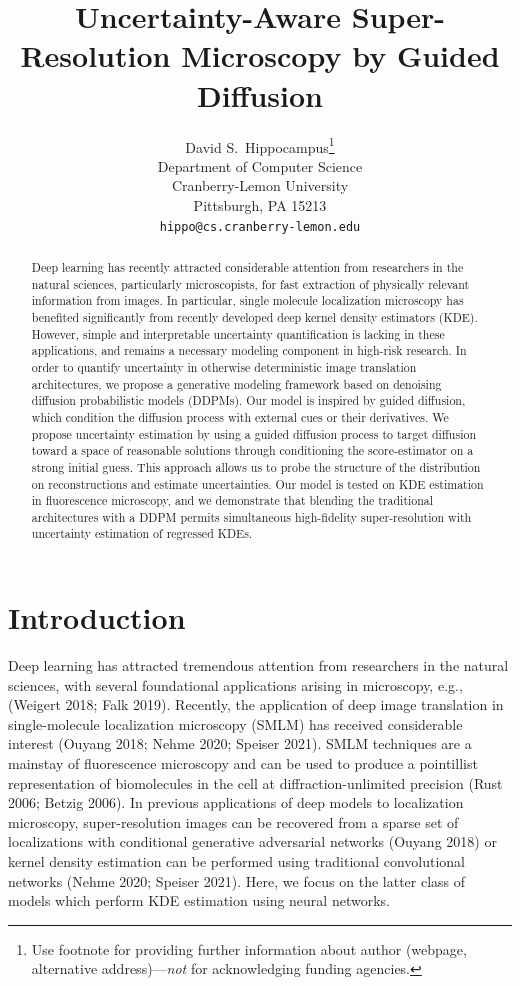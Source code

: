 \documentclass{article}
\title{Uncertainty-Aware Super-Resolution Microscopy by Guided Diffusion}
\author{%
  David S.~Hippocampus\thanks{Use footnote for providing further information
    about author (webpage, alternative address)---\emph{not} for acknowledging
    funding agencies.} \\
  Department of Computer Science\\
  Cranberry-Lemon University\\
  Pittsburgh, PA 15213 \\
  \texttt{hippo@cs.cranberry-lemon.edu} \\
}
\begin{document}
\maketitle


\begin{abstract}

Deep learning has recently attracted considerable attention from researchers in the natural sciences, particularly microscopists, for fast extraction of physically relevant information from images. In particular, single molecule localization microscopy has benefited significantly from recently developed deep kernel density estimators (KDE). However, simple and interpretable uncertainty quantification is lacking in these applications, and remains a necessary modeling component in high-risk research. In order to quantify uncertainty in otherwise deterministic image translation architectures, we propose a generative modeling framework based on denoising diffusion probabilistic models (DDPMs). Our model is inspired by guided diffusion, which condition the diffusion process with external cues or their derivatives. We propose uncertainty estimation by using a guided diffusion process to target diffusion toward a space of reasonable solutions through conditioning the score-estimator on a strong initial guess. This approach allows us to probe the structure of the distribution on reconstructions and estimate uncertainties. Our model is tested on KDE estimation in fluorescence microscopy, and we demonstrate that blending the traditional architectures with a DDPM permits simultaneous high-fidelity super-resolution with uncertainty estimation of regressed KDEs. 
\end{abstract}

\section{Introduction}

Deep learning has attracted tremendous attention from researchers in the natural sciences, with several foundational applications arising in microscopy, e.g., (Weigert 2018; Falk 2019). Recently, the application of deep image translation in single-molecule localization microscopy (SMLM) has received considerable interest (Ouyang 2018; Nehme 2020; Speiser 2021). SMLM techniques are a mainstay of fluorescence microscopy and can be used to produce a pointillist representation of biomolecules in the cell at diffraction-unlimited precision (Rust 2006; Betzig 2006). In previous applications of deep models to localization microscopy, super-resolution images can be recovered from a sparse set of localizations with conditional generative adversarial networks (Ouyang 2018) or kernel density estimation can be performed using traditional convolutional networks (Nehme 2020; Speiser 2021). Here, we focus on the latter class of models which perform KDE estimation using neural networks. 
\end{document}
